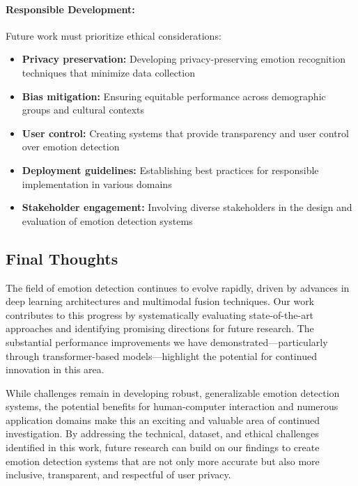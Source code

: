 \documentclass[12pt]{article}
\begin{document}
\paragraph{Responsible Development:}
Future work must prioritize ethical considerations:

\begin{itemize}
    \item \textbf{Privacy preservation:} Developing privacy-preserving emotion recognition techniques that minimize data collection
    
    \item \textbf{Bias mitigation:} Ensuring equitable performance across demographic groups and cultural contexts
    
    \item \textbf{User control:} Creating systems that provide transparency and user control over emotion detection
    
    \item \textbf{Deployment guidelines:} Establishing best practices for responsible implementation in various domains
    
    \item \textbf{Stakeholder engagement:} Involving diverse stakeholders in the design and evaluation of emotion detection systems
\end{itemize}

\subsection{Final Thoughts}
The field of emotion detection continues to evolve rapidly, driven by advances in deep learning architectures and multimodal fusion techniques. Our work contributes to this progress by systematically evaluating state-of-the-art approaches and identifying promising directions for future research. The substantial performance improvements we have demonstrated—particularly through transformer-based models—highlight the potential for continued innovation in this area.

While challenges remain in developing robust, generalizable emotion detection systems, the potential benefits for human-computer interaction and numerous application domains make this an exciting and valuable area of continued investigation. By addressing the technical, dataset, and ethical challenges identified in this work, future research can build on our findings to create emotion detection systems that are not only more accurate but also more inclusive, transparent, and respectful of user privacy.
\end{document}
